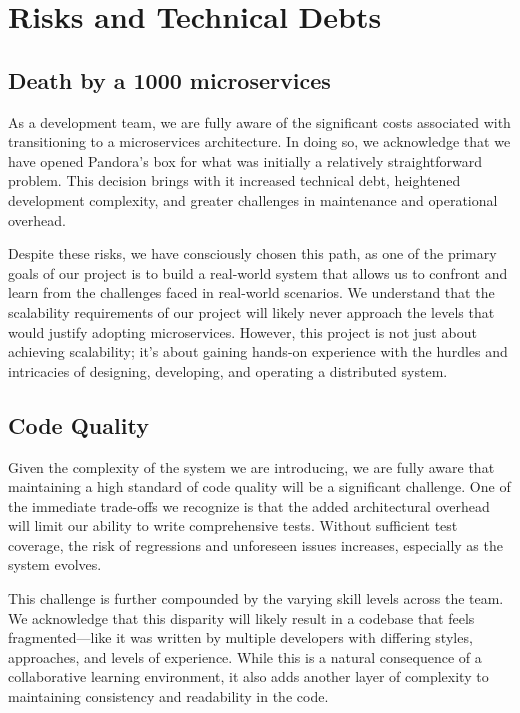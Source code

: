 \hypertarget{section-technical-risks}{%
\section{Risks and Technical Debts}\label{section-technical-risks}}

\subsection{Death by a 1000 microservices}
As a development team, we are fully aware of the significant costs associated with transitioning to a microservices architecture. In doing so, we acknowledge that we have opened Pandora’s box for what was initially a relatively straightforward problem. This decision brings with it increased technical debt, heightened development complexity, and greater challenges in maintenance and operational overhead.

Despite these risks, we have consciously chosen this path, as one of the primary goals of our project is to build a real-world system that allows us to confront and learn from the challenges faced in real-world scenarios. We understand that the scalability requirements of our project will likely never approach the levels that would justify adopting microservices. However, this project is not just about achieving scalability; it’s about gaining hands-on experience with the hurdles and intricacies of designing, developing, and operating a distributed system.

\subsection{Code Quality}
Given the complexity of the system we are introducing, we are fully aware that maintaining a high standard of code quality will be a significant challenge. One of the immediate trade-offs we recognize is that the added architectural overhead will limit our ability to write comprehensive tests. Without sufficient test coverage, the risk of regressions and unforeseen issues increases, especially as the system evolves.

This challenge is further compounded by the varying skill levels across the team. We acknowledge that this disparity will likely result in a codebase that feels fragmented—like it was written by multiple developers with differing styles, approaches, and levels of experience. While this is a natural consequence of a collaborative learning environment, it also adds another layer of complexity to maintaining consistency and readability in the code.

